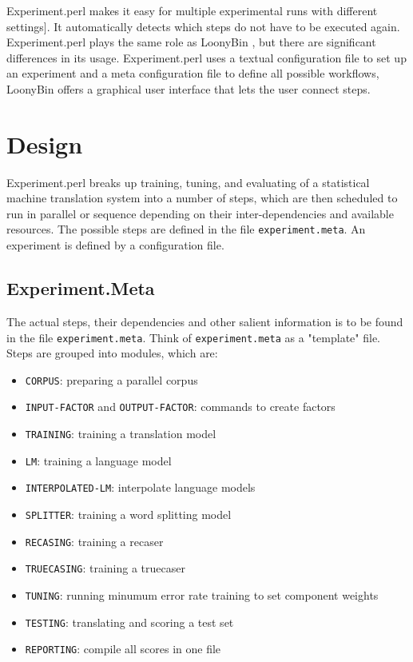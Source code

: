 \documentclass{pbml}
\begin{document}
Experiment.perl makes it easy for multiple experimental runs with different settings]. It automatically detects which steps do not have to be executed again.
Experiment.perl plays the same role as LoonyBin \citep{loonybin}, but there are significant differences in its usage. Experiment.perl uses a textual configuration file to set up an experiment and a meta configuration file to define all possible workflows, LoonyBin offers a graphical user interface that lets the user connect steps.




\section{Design}

Experiment.perl breaks up training, tuning, and evaluating of a statistical machine translation system into a number of steps, which are then scheduled to run in parallel or sequence depending on their inter-dependencies and available resources. The possible steps are defined in the file {\tt experiment.meta}. An experiment is defined by a configuration file.

\subsection{Experiment.Meta}


The actual steps, their dependencies and other salient information is to be found in the file {\tt experiment.meta}. Think of {\tt experiment.meta} as a "template" file.
Steps are grouped into modules, which are:

\begin{itemize}
\item {\tt CORPUS}: preparing a parallel corpus

\item {\tt INPUT-FACTOR} and {\tt OUTPUT-FACTOR}: commands to create factors

\item {\tt TRAINING}: training a translation model

\item {\tt LM}: training a language model

\item {\tt INTERPOLATED-LM}: interpolate language models

\item {\tt SPLITTER}: training a word splitting model

\item {\tt RECASING}: training a recaser

\item {\tt TRUECASING}: training a truecaser

\item {\tt TUNING}: running minumum error rate training to set component weights

\item {\tt TESTING}: translating and scoring a test set

\item {\tt REPORTING}: compile all scores in one file

\end{itemize}
\end{document}
